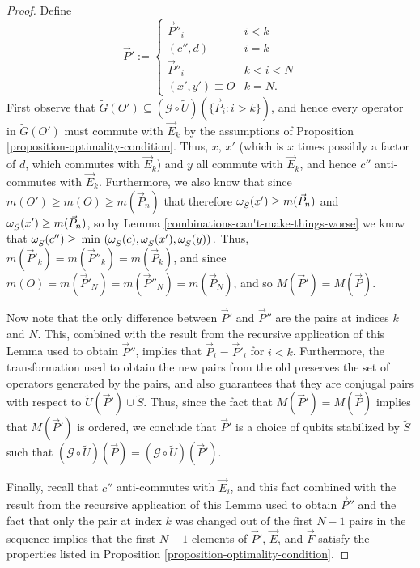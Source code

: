 \documentclass[twocolumn,showpacs,preprintnumbers,amsmath,amssymb,nofootinbib,pra,floatfix]{revtex4-1}
\newcommand{\lst}{\vec}
\newcommand{\set}{\tilde}
\newcommand{\genfun}{\mathcal{G}}
\begin{document}
\begin{proof}
Define
$$
\lst P':=
\begin{cases}
\lst P''_i & i < k \\
(c'',d) & i = k \\
\lst P''_i & k < i < N \\
(x',y')\equiv O & k = N.
\end{cases}
$$
First observe that $\set G(O')\subseteq (\genfun\circ\set U)(\{\lst P_i:i>k\})$, and hence every operator in $\set G(O')$ must commute with $\lst E_k$ by the assumptions of Proposition \ref{proposition-optimality-condition}.  Thus, $x$, $x'$ (which is $x$ times possibly a factor of $d$, which commutes with $\lst E_k$) and $y$ all commute with $\lst E_k$, and hence $c''$ anti-commutes with $\lst E_k$.  Furthermore, we also know that since $m(O')\ge m(O) \ge m(\lst P_n)$ that therefore $\om_{\set S}(x')\ge m(\lst P_n)$ and $\om_{\set S}(x')\ge m(\lst P_n)$, so by Lemma \ref{combinations-can't-make-things-worse} we know that $\om_{\set S}(c'') \ge \text{\min}\,\paren{\om_{\set S}(c),\om_{\set S}(x'),\om_{\set S}(y)}.$  Thus, $m(\lst P'_k)=m(\lst P''_k)=m(\lst P_k)$, and since $m(O)=m(\lst P'_N)=m(\lst P''_N)=m(\lst P_N)$, and so $M(\lst P')=M(\lst P)$.

Now note that the only difference between $\lst P'$ and $\lst P''$ are the pairs at indices $k$ and $N$.  This, combined with the result from the recursive application of this Lemma used to obtain $\lst P''$, implies that $\lst P_i=\lst P'_i$ for $i < k$.  Furthermore, the transformation used to obtain the new pairs from the old preserves the set of operators generated by the pairs, and also guarantees that they are conjugal pairs with respect to $\set U(\lst P')\cup\set S$.  Thus, since the fact that $M(\lst P')=M(\lst P)$ implies that $M(\lst P')$ is ordered, we conclude that $\lst P'$ is a choice of qubits stabilized by $\set S$ such that $(\genfun\circ\set U)(\lst P)=(\genfun\circ\set U)(\lst P')$.

Finally, recall that $c''$ anti-commutes with $\lst E_i$, and this fact combined with the result from the recursive application of this Lemma used to obtain $\lst P''$ and the fact that only the pair at index $k$ was changed out of the first $N-1$ pairs in the sequence implies that the first $N-1$ elements of $\lst P'$, $\lst E$, and $\lst F$ satisfy the properties listed in Proposition \ref{proposition-optimality-condition}.
\end{proof}
\end{document}
